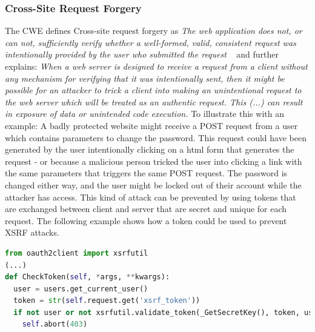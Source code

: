 \documentclass[
	a4paper,
	pagesize,
	pdftex,
	12pt,
	twoside, %
	BCOR=5mm, %
	ngerman,
	fleqn,
	final,
	]{scrartcl}
\begin{document}
\subsubsection{Cross-Site Request Forgery}
The CWE defines Cross-site request forgery as \textit{The web application does not, or can not, sufficiently verify whether a well-formed, valid, consistent request was intentionally provided by the user who submitted the request} ~\cite{CommonWeaknessEnumeration.19.9.2019b} and further explains: \textit{When a web server is designed to receive a request from a client without any mechanism for verifying that it was intentionally sent, then it might be possible for an attacker to trick a client into making an unintentional request to the web server which will be treated as an authentic request. This (...) can result in exposure of data or unintended code execution.} To illustrate this with an example: A badly protected website might receive a POST request from a user which contains parameters to change the password. This request could have been generated by the user intentionally clicking on a html form that generates the request - or because a malicious person tricked the user into clicking a link with the same parameters that triggers the same POST request. The password is changed either way, and the user might be locked out of their account while the attacker has access. This kind of attack can be prevented by using tokens that are exchanged between client and server that are secret and unique for each request. The following example shows how a token could be used to prevent XSRF attacks.
\begin{lstlisting}[language=Python, showstringspaces=False]
from oauth2client import xsrfutil
(...)
def CheckToken(self, *args, **kwargs):
  user = users.get_current_user()
  token = str(self.request.get('xsrf_token'))
  if not user or not xsrfutil.validate_token(_GetSecretKey(), token, user.user_id()):
    self.abort(403)
  
\end{lstlisting}
\end{document}
